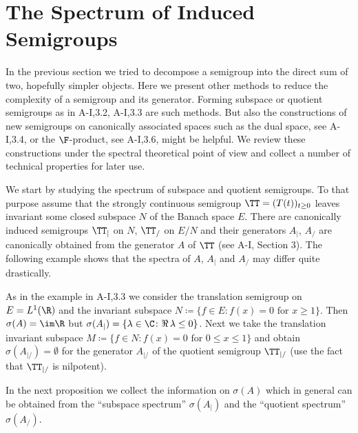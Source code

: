 \section{The Spectrum of Induced Semigroups}\label{sec:a3-4}
In the previous section we tried to decompose a semigroup into the direct sum of two, hopefully simpler objects.
Here we present other methods to reduce the complexity of a semigroup and its generator.
Forming subspace or quotient semigroups as in A-I,3.2, A-I,3.3 are such methods.
But also the constructions of new semigroups on canonically associated spaces such as the dual space, see A-I,3.4, or the $\F$-product, see A-I,3.6, might be helpful.
We review these constructions under the spectral theoretical point of view and collect a number of technical properties for later use.

We start by studying the spectrum of subspace and quotient semigroups.
To that purpose assume that the strongly continuous semigroup $\TT = (T(t))_{t \geq 0}$ leaves invariant some closed subspace $N$ of the Banach space $E$.
There are canonically induced semigroups $\TT_{|}$ on $N$, \resp $\TT_{/}$ on $E/N$ and their generators $A_{|}$, \resp $A_{/}$ are canonically obtained from the generator $A$ of $\TT$ (see A-I, Section 3).
The following example shows that the spectra of $A$, $A_{|}$ and $A_{/}$ may differ quite drastically.
\begin{example}\label{ex:a3-4.1}
As in the example in A-I,3.3 we consider the translation semigroup on $E = L^{1}(\R)$ and the invariant subspace $N \coloneqq \{f \in E \colon f(x) = 0 \text{ for } x \geq 1\}$.
Then $\sigma(A) = \im\R$ but $\sigma(A_{|}) = \{\lambda \in \C \colon \Re\,\lambda \leq 0\}$.
Next we take the translation invariant subspace $M \coloneqq \{f \in N \colon f(x) = 0 \text{ for } 0 \leq x \leq 1\}$ and obtain $\sigma(A_{|/}) = \emptyset$ for the generator $A_{|/}$ of the quotient semigroup $\TT_{|/}$ (use the fact that $\TT_{|/}$ is nilpotent).
\end{example}

In the next proposition we collect the information on $\sigma(A)$ which in general can be obtained from the \enquote{subspace spectrum} $\sigma(A_{|})$ and the \enquote{quotient spectrum} $\sigma(A_{/})$.

